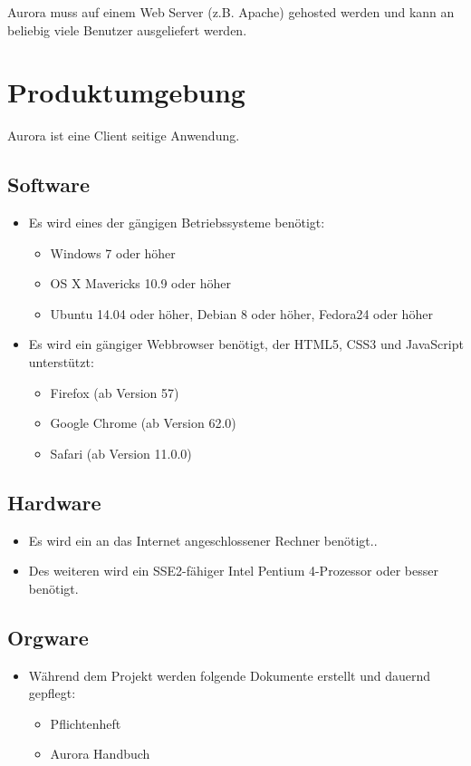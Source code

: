 \documentclass[parskip=full,11pt,twoside]{scrartcl}
\begin{document}
Aurora muss auf einem Web Server (z.B. Apache) gehosted werden und kann an beliebig viele Benutzer ausgeliefert werden.


\newpage
\section{Produktumgebung}
Aurora ist eine Client seitige Anwendung.

\subsection{Software}
	\begin{itemize}
		\item Es wird eines der gängigen Betriebssysteme benötigt:
		\begin{itemize}
			\item Windows 7 oder höher
			\item OS X Mavericks 10.9 oder höher
			\item Ubuntu 14.04 oder höher, Debian 8 oder höher, Fedora24 oder höher
		\end{itemize}
		\item Es wird ein gängiger Webbrowser benötigt, der HTML5, CSS3 und JavaScript unterstützt:
			\begin{itemize}
				\item Firefox (ab Version 57)
				\item Google Chrome (ab Version 62.0)
				\item Safari (ab Version 11.0.0)
			\end{itemize}
	\end{itemize}

\subsection{Hardware}
	\begin{itemize}
		\item Es wird ein an das Internet angeschlossener Rechner benötigt..
		\item Des weiteren wird ein SSE2-fähiger Intel Pentium 4-Prozessor oder besser benötigt.
	\end{itemize}
\subsection{Orgware}
	\begin{itemize}
		\item Während dem Projekt werden folgende Dokumente erstellt und dauernd gepflegt:
			\begin{itemize}
				\item Pflichtenheft
				\item Aurora Handbuch
			\end{itemize}
	\end{itemize}
\newpage
\end{document}
